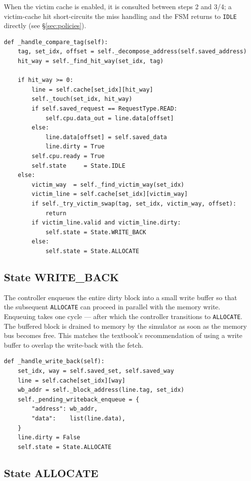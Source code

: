 \documentclass[11pt,a4paper]{article}
\begin{document}
When the victim cache is enabled, it is consulted between steps 2 and 3/4;
a victim-cache hit short-circuits the miss handling and the FSM returns to
\texttt{IDLE} directly (see \S\ref{sec:policies}).

\begin{lstlisting}
def _handle_compare_tag(self):
    tag, set_idx, offset = self._decompose_address(self.saved_address)
    hit_way = self._find_hit_way(set_idx, tag)

    if hit_way >= 0:
        line = self.cache[set_idx][hit_way]
        self._touch(set_idx, hit_way)
        if self.saved_request == RequestType.READ:
            self.cpu.data_out = line.data[offset]
        else:
            line.data[offset] = self.saved_data
            line.dirty = True
        self.cpu.ready = True
        self.state     = State.IDLE
    else:
        victim_way  = self._find_victim_way(set_idx)
        victim_line = self.cache[set_idx][victim_way]
        if self._try_victim_swap(tag, set_idx, victim_way, offset):
            return
        if victim_line.valid and victim_line.dirty:
            self.state = State.WRITE_BACK
        else:
            self.state = State.ALLOCATE
\end{lstlisting}

\subsection{State WRITE\_BACK}

The controller enqueues the entire dirty block into a small write buffer so
that the subsequent \texttt{ALLOCATE} can proceed in parallel with the memory
write. Enqueuing takes one cycle — after which the controller transitions to
\texttt{ALLOCATE}. The buffered block is drained to memory by the simulator
as soon as the memory bus becomes free. This matches the textbook's
recommendation of using a write buffer to overlap the write-back with the
fetch.

\begin{lstlisting}
def _handle_write_back(self):
    set_idx, way = self.saved_set, self.saved_way
    line = self.cache[set_idx][way]
    wb_addr = self._block_address(line.tag, set_idx)
    self._pending_writeback_enqueue = {
        "address": wb_addr,
        "data":    list(line.data),
    }
    line.dirty = False
    self.state = State.ALLOCATE
\end{lstlisting}

\subsection{State ALLOCATE}
\end{document}
